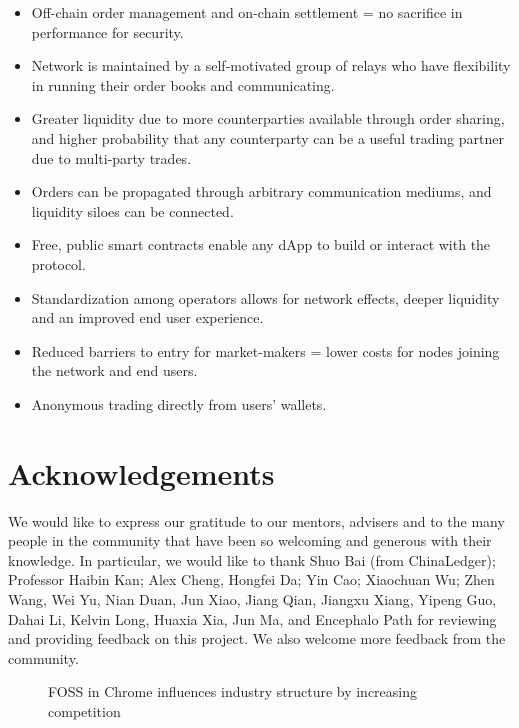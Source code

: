 \documentclass[UTF8,nofonts]{article}
\begin{document}
\begin{itemize}
	\item Off-chain order management and on-chain settlement = no sacrifice in performance for security.
	\item Network is maintained by a self-motivated group of relays who have flexibility in running their order books and communicating.
	\item Greater liquidity due to more counterparties available through order sharing, and higher probability that any counterparty can be a useful trading partner due to multi-party trades.
	\item Orders can be propagated through arbitrary communication mediums, and liquidity siloes can be connected.
	\item Free, public smart contracts enable any dApp to build or interact with the protocol.
	\item Standardization among operators allows for network effects, deeper liquidity and an improved end user experience.
	\item Reduced barriers to entry for market-makers = lower costs for nodes joining the network and end users.
	\item Anonymous trading directly from users’ wallets.
\end{itemize}

\section{Acknowledgements}
We would like to express our gratitude to our mentors, advisers and to the many people in the community that have been so welcoming and generous with their knowledge. In particular, we would like to thank Shuo Bai (from ChinaLedger); Professor Haibin Kan; Alex Cheng, Hongfei Da; Yin Cao; Xiaochuan Wu; Zhen Wang, Wei Yu, Nian Duan, Jun Xiao, Jiang Qian, Jiangxu Xiang, Yipeng Guo, Dahai Li, Kelvin Long, Huaxia Xia, Jun Ma, and Encephalo Path for reviewing and providing feedback on this project. We also welcome more feedback from the community.






\newpage

\begin{figure}[h]
\centering
{}
\caption{FOSS in Chrome influences industry structure by increasing competition}
\label{fig:6forces}
\end{figure}
\end{document}
